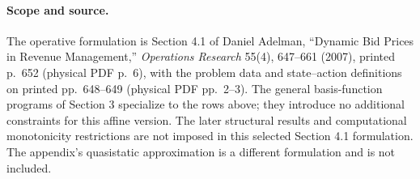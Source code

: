 \documentclass{article}
\begin{document}
\paragraph{Scope and source.}
The operative formulation is Section 4.1 of Daniel Adelman,
``Dynamic Bid Prices in Revenue Management,'' \emph{Operations Research}
55(4), 647--661 (2007), printed p.~652 (physical PDF p.~6), with the
problem data and state--action definitions on printed pp.~648--649
(physical PDF pp.~2--3). The general basis-function programs of
Section 3 specialize to the rows above; they introduce no additional
constraints for this affine version. The later structural results and
computational monotonicity restrictions are not imposed in this
selected Section 4.1 formulation. The appendix's quasistatic
approximation is a different formulation and is not included.
\end{document}
